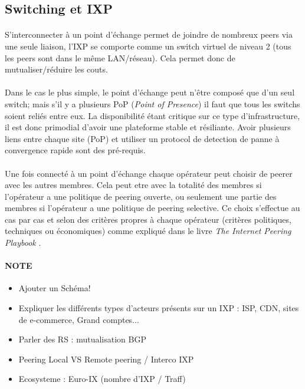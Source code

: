 \subsection{Switching et IXP}

\paragraph{}
S'interconnecter à un point d'échange permet de joindre de nombreux peers via une seule liaison, l'IXP se comporte comme un switch virtuel de niveau 2 (tous les peers sont dans le même LAN/réseau). Cela permet donc de mutualiser/réduire les couts.

\paragraph{}
Dans le cas le plus simple, le point d'échange peut n'être composé que d'un seul switch; mais s'il y a plusieurs PoP (\emph{Point of Presence}) il faut que tous les switchs soient reliés entre eux. La disponibilité étant critique sur ce type d'infrastructure, il est donc primodial d'avoir une plateforme stable et résiliante. Avoir plusieurs liens entre chaque site (PoP) et utiliser un protocol de detection de panne à convergence rapide sont des pré-requis.

\paragraph{}
Une fois connecté à un point d'échange chaque opérateur peut choisir de peerer avec les autres membres. Cela peut etre avec la totalité des membres si l'opérateur a une politique de peering ouverte, ou seulement une partie des membres si l'opérateur a une politique de peering selective. Ce choix s'effectue au cas par cas et selon des critères propres à chaque opérateur (critères politiques, techniques ou économiques) comme expliqué dans le livre \emph{The Internet Peering Playbook} \cite{fenioux:PeeringPlaybook}.

\paragraph{NOTE}
\begin{itemize}
\item Ajouter un Schéma!
\item Expliquer les différents types d'acteurs présents sur un IXP : ISP, CDN, sites de e-commerce, Grand comptes...
\item Parler des RS : mutualisation BGP
\item Peering Local VS Remote peering / Interco IXP
\item Ecosysteme : Euro-IX (nombre d'IXP / Traff)
\end{itemize}

